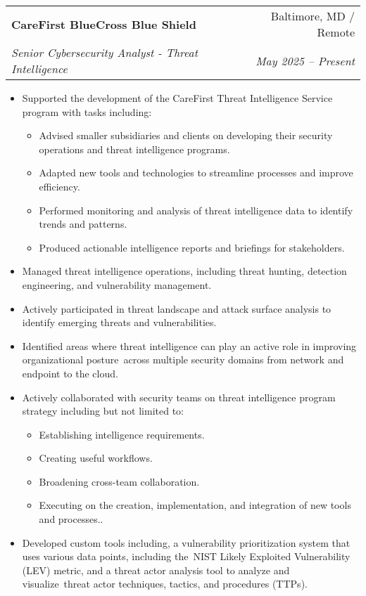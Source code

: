 \documentclass[letterpaper,11pt]{article}
\makeatletter
\newcommand{\resumeSubheading}[4]{
  \vspace{-1pt}\item
    \begin{tabular*}{0.97\textwidth}[t]{l@{\extracolsep{\fill}}r}
      \textbf{#1} & #2 \\
      \textit{\small#3} & \textit{\small #4} \\
    \end{tabular*}\vspace{-5pt}
}
\newcommand{\resumeItemListStart}{\begin{itemize}[nosep]}
\newcommand{\resumeItemListEnd}{\end{itemize}\vspace{-5pt}}
\makeatother
\begin{document}
\resumeSubheading
{CareFirst BlueCross Blue Shield}{Baltimore, MD / Remote}
{Senior Cybersecurity Analyst - Threat Intelligence}{May 2025 -- Present}
\resumeItemListStart
\item Supported the development of the CareFirst Threat Intelligence Service program with tasks including:
\begin{itemize}[nosep]
  \item Advised smaller subsidiaries and clients on developing their security operations and threat intelligence programs.
  \item Adapted new tools and technologies to streamline processes and improve efficiency.
  \item Performed monitoring and analysis of threat intelligence data to identify trends and patterns.
  \item Produced actionable intelligence reports and briefings for stakeholders.
\end{itemize}
\item Managed threat intelligence operations, including threat hunting, detection engineering, and vulnerability management.
\item Actively participated in threat landscape and attack surface analysis to identify emerging threats and vulnerabilities.
\item Identified areas where threat intelligence can play an active role in improving organizational posture\
across multiple security domains from network and endpoint to the cloud.
\item Actively collaborated with security teams on threat intelligence program strategy including but not limited to:
\begin{itemize}[nosep]
  \item Establishing intelligence requirements.
  \item Creating useful workflows.
  \item Broadening cross-team collaboration.
  \item Executing on the creation, implementation, and integration of new tools and processes..
\end{itemize}
\item Developed custom tools including, a vulnerability prioritization system that uses various data points, including the\
NIST Likely Exploited Vulnerability (LEV) metric, and a threat actor analysis tool to analyze and visualize\
threat actor techniques, tactics, and procedures (TTPs).
\resumeItemListEnd
\end{document}

